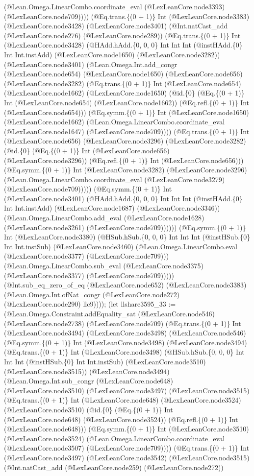 \documentclass[11pt]{article}
\begin{document}
(@Lean.Omega.LinearCombo.coordinate\_eval (@LexLeanCore.node3393) (@LexLeanCore.node709)))) (@Eq.trans.\{(0 + 1)\} Int (@LexLeanCore.node3383) (@LexLeanCore.node3428) (@LexLeanCore.node3401) (@Int.natCast\_add (@LexLeanCore.node276) (@LexLeanCore.node289)) (@Eq.trans.\{(0 + 1)\} Int (@LexLeanCore.node3428) (@HAdd.hAdd.\{0, 0, 0\} Int Int Int (@instHAdd.\{0\} Int Int.instAdd) (@LexLeanCore.node1650) (@LexLeanCore.node3282)) (@LexLeanCore.node3401) (@Lean.Omega.Int.add\_congr (@LexLeanCore.node654) (@LexLeanCore.node1650) (@LexLeanCore.node656) (@LexLeanCore.node3282) (@Eq.trans.\{(0 + 1)\} Int (@LexLeanCore.node654) (@LexLeanCore.node1662) (@LexLeanCore.node1650) (@id.\{0\} (@Eq.\{(0 + 1)\} Int (@LexLeanCore.node654) (@LexLeanCore.node1662)) (@Eq.refl.\{(0 + 1)\} Int (@LexLeanCore.node654))) (@Eq.symm.\{(0 + 1)\} Int (@LexLeanCore.node1650) (@LexLeanCore.node1662) (@Lean.Omega.LinearCombo.coordinate\_eval (@LexLeanCore.node1647) (@LexLeanCore.node709)))) (@Eq.trans.\{(0 + 1)\} Int (@LexLeanCore.node656) (@LexLeanCore.node3296) (@LexLeanCore.node3282) (@id.\{0\} (@Eq.\{(0 + 1)\} Int (@LexLeanCore.node656) (@LexLeanCore.node3296)) (@Eq.refl.\{(0 + 1)\} Int (@LexLeanCore.node656))) (@Eq.symm.\{(0 + 1)\} Int (@LexLeanCore.node3282) (@LexLeanCore.node3296) (@Lean.Omega.LinearCombo.coordinate\_eval (@LexLeanCore.node3279) (@LexLeanCore.node709))))) (@Eq.symm.\{(0 + 1)\} Int (@LexLeanCore.node3401) (@HAdd.hAdd.\{0, 0, 0\} Int Int Int (@instHAdd.\{0\} Int Int.instAdd) (@LexLeanCore.node1687) (@LexLeanCore.node3346)) (@Lean.Omega.LinearCombo.add\_eval (@LexLeanCore.node1628) (@LexLeanCore.node3261) (@LexLeanCore.node709)))))) (@Eq.symm.\{(0 + 1)\} Int (@LexLeanCore.node3380) (@HSub.hSub.\{0, 0, 0\} Int Int Int (@instHSub.\{0\} Int Int.instSub) (@LexLeanCore.node3460) (@Lean.Omega.LinearCombo.eval (@LexLeanCore.node3377) (@LexLeanCore.node709))) (@Lean.Omega.LinearCombo.sub\_eval (@LexLeanCore.node3375) (@LexLeanCore.node3377) (@LexLeanCore.node709))))) (@Int.sub\_eq\_zero\_of\_eq (@LexLeanCore.node652) (@LexLeanCore.node3383) (@Lean.Omega.Int.ofNat\_congr (@LexLeanCore.node272) (@LexLeanCore.node290) llc9)))); (let llshare3595\_33 := (@Lean.Omega.Constraint.addEquality\_sat (@LexLeanCore.node546) (@LexLeanCore.node2738) (@LexLeanCore.node709) (@Eq.trans.\{(0 + 1)\} Int (@LexLeanCore.node3494) (@LexLeanCore.node3498) (@LexLeanCore.node546) (@Eq.symm.\{(0 + 1)\} Int (@LexLeanCore.node3498) (@LexLeanCore.node3494) (@Eq.trans.\{(0 + 1)\} Int (@LexLeanCore.node3498) (@HSub.hSub.\{0, 0, 0\} Int Int Int (@instHSub.\{0\} Int Int.instSub) (@LexLeanCore.node3510) (@LexLeanCore.node3515)) (@LexLeanCore.node3494) (@Lean.Omega.Int.sub\_congr (@LexLeanCore.node648) (@LexLeanCore.node3510) (@LexLeanCore.node3497) (@LexLeanCore.node3515) (@Eq.trans.\{(0 + 1)\} Int (@LexLeanCore.node648) (@LexLeanCore.node3524) (@LexLeanCore.node3510) (@id.\{0\} (@Eq.\{(0 + 1)\} Int (@LexLeanCore.node648) (@LexLeanCore.node3524)) (@Eq.refl.\{(0 + 1)\} Int (@LexLeanCore.node648))) (@Eq.symm.\{(0 + 1)\} Int (@LexLeanCore.node3510) (@LexLeanCore.node3524) (@Lean.Omega.LinearCombo.coordinate\_eval (@LexLeanCore.node3507) (@LexLeanCore.node709)))) (@Eq.trans.\{(0 + 1)\} Int (@LexLeanCore.node3497) (@LexLeanCore.node3542) (@LexLeanCore.node3515) (@Int.natCast\_add (@LexLeanCore.node259) (@LexLeanCore.node272)) 
\end{document}

